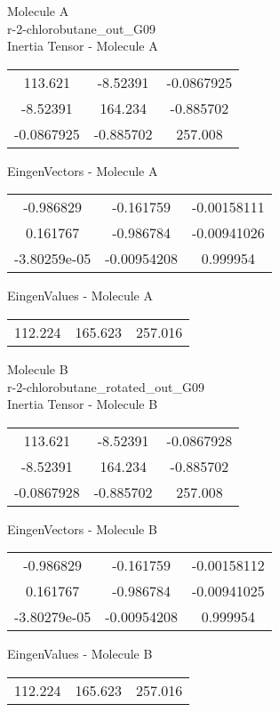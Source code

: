 \begin{multicols}{2}
\begin{center}
Molecule A \\ 
r-2-chlorobutane\_out\_G09
\\
Inertia Tensor - Molecule A \\
\vtab
\begin{tabular}{|c c c|}
113.621	 & 	-8.52391	 & 	-0.0867925	 \\
-8.52391	 & 	164.234	 & 	-0.885702	 \\
-0.0867925	 & 	-0.885702	 & 	257.008
\end{tabular}

\vtab
 EingenVectors - Molecule A     \\
\vtab
\begin{tabular}{|c c c|}
-0.986829	 & 	-0.161759	 & 	-0.00158111	 \\
0.161767	 & 	-0.986784	 & 	-0.00941026	 \\
-3.80259e-05	 & 	-0.00954208	 & 	0.999954
\end{tabular}

\vtab
 EingenValues - Molecule A     \\
\vtab
\begin{tabular}{|c c c|}
112.224	 & 	165.623	 & 	257.016
\end{tabular}
\columnbreak

Molecule B \\ 
r-2-chlorobutane\_rotated\_out\_G09
\\
Inertia Tensor - Molecule B \\
\vtab
\begin{tabular}{|c c c|}
113.621	 & 	-8.52391	 & 	-0.0867928	 \\
-8.52391	 & 	164.234	 & 	-0.885702	 \\
-0.0867928	 & 	-0.885702	 & 	257.008
\end{tabular}

\vtab
 EingenVectors - Molecule B     \\
\vtab
\begin{tabular}{|c c c|}
-0.986829	 & 	-0.161759	 & 	-0.00158112	 \\
0.161767	 & 	-0.986784	 & 	-0.00941025	 \\
-3.80279e-05	 & 	-0.00954208	 & 	0.999954
\end{tabular}

\vtab
 EingenValues - Molecule B     \\
\vtab
\begin{tabular}{|c c c|}
112.224	 & 	165.623	 & 	257.016
\end{tabular}

\end{center}
\end{multicols}
